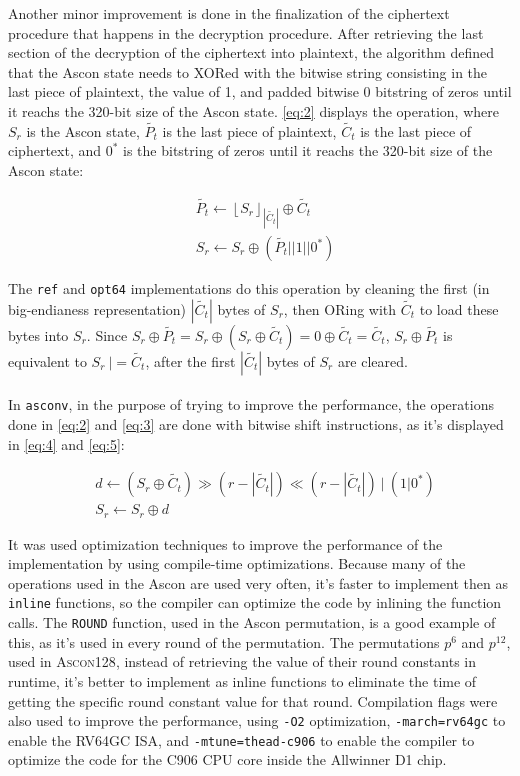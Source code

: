 \documentclass[11pt,twoside]{article}
\begin{document}
Another minor improvement is done in the finalization of the ciphertext procedure that happens in the decryption procedure. After retrieving the last section of the decryption of the ciphertext into plaintext, the algorithm defined that the Ascon state needs to XORed with the bitwise string consisting in the last piece of plaintext, the value of 1, and padded bitwise 0 bitstring of zeros until it reachs the 320-bit size of the Ascon state. \cref{eq:2} displays the operation, where $S_r$ is the Ascon state, $\tilde{P_t}$ is the last piece of plaintext, $\tilde{C_t}$ is the last piece of ciphertext, and $0^*$ is the bitstring of zeros until it reachs the 320-bit size of the Ascon state:

\begin{align}
   & \tilde{P_{t}} \leftarrow  {\left \lfloor S_{r}  \right \rfloor}_{\left| \tilde{C_{t}} \right|} \oplus \tilde{C_{t}} \label{eq:2} \\
   & S_r \leftarrow S_r \oplus (\tilde{P_{t}} || 1 || 0^{*}) \label{eq:3}
\end{align}

The \texttt{ref} and \texttt{opt64} implementations do this operation by cleaning the first (in big-endianess representation) $| \tilde{C_{t}} |$ bytes of $S_r$, then ORing with $\tilde{C_t}$ to load these bytes into $S_r$. Since $S_r \oplus \tilde{P_t} = S_r \oplus  (S_r \oplus \tilde{C_t}) = 0 \oplus \tilde{C_t} = \tilde{C_t}$, $S_r \oplus \tilde{P_t}$ is equivalent to $S_{r} \ |= \tilde{C_t}$, after the first $| \tilde{C_{t}} |$ bytes of $S_r$ are cleared.
\\
\\

In \texttt{asconv}, in the purpose of trying to improve the performance, the operations done in \cref{eq:2} and \cref{eq:3} are done with bitwise shift instructions, as it's displayed in \cref{eq:4} and \cref{eq:5}:

\begin{align}
   & d \leftarrow (S_r \oplus \tilde{C_{t}}) \gg (r - | \tilde{C_{t}}|) \ll (r - | \tilde{C_{t}} |) \ | \ (1|0^*) \label{eq:4} \\
   & S_r \leftarrow S_r \oplus d \label{eq:5}
\end{align}

It was used optimization techniques to improve the performance of the implementation by using compile-time optimizations. Because many of the operations used in the Ascon are used very often, it's faster to implement then as \texttt{inline} functions, so the compiler can optimize the code by inlining the function calls. The \texttt{ROUND} function, used in the Ascon permutation, is a good example of this, as it's used in every round of the permutation. The permutations $p^6$ and $p^{12}$, used in \textsc{Ascon128}, instead of retrieving the value of their round constants in runtime, it's better to implement as inline functions to eliminate the time of getting the specific round constant value for that round. Compilation flags were also used to improve the performance, using \texttt{-O2} optimization, \texttt{-march=rv64gc} to enable the RV64GC ISA, and \texttt{-mtune=thead-c906} to enable the compiler to optimize the code for the C906 CPU core inside the Allwinner D1 chip.
\end{document}
